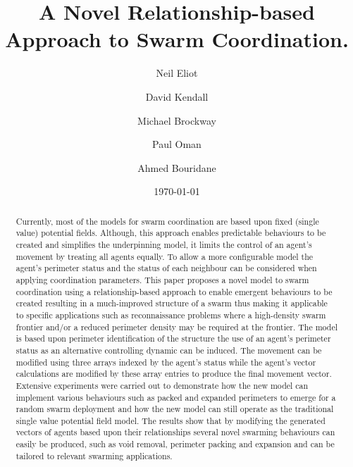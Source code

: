 \documentclass[12pt,a4paper]{IEEEtran}
\title{A Novel Relationship-based Approach to Swarm Coordination.}
\author[*]{Neil Eliot}
\author[ ]{David Kendall}
\author[ ]{Michael Brockway}
\author[ ]{Paul Oman}
\author[ ]{Ahmed Bouridane}
\affil[ ] {Department of Computer Sciences, Northumbria University}
\affil[*] {Corresponding author: Dr Neil Eliot, neil.eliot@northumbria.ac.uk}
\date{\today}
\begin{document}
\maketitle

\begin{abstract}
Currently, most of the models for swarm coordination are based upon fixed (single value) potential fields. Although, this approach enables predictable behaviours to be created and simplifies the underpinning model, it limits the control of an agent’s movement by treating all agents equally. To allow a more configurable model the agent’s perimeter status and the status of each neighbour can be considered when applying coordination parameters.  This paper proposes a novel model to swarm coordination using a relationship-based approach to enable emergent behaviours to be created resulting in a much-improved structure of a swarm thus making it applicable to specific applications such as reconnaissance problems where a high-density swarm frontier and/or a reduced perimeter density may be required at the frontier. The model is based upon perimeter identification of the structure the use of an agent’s perimeter status as an alternative controlling dynamic can be induced.
The movement can be modified using three arrays indexed by the agent’s status while the agent’s vector calculations are modified by these array entries to produce the final movement vector. Extensive experiments were carried out to demonstrate how the new model can implement various behaviours such as packed and expanded perimeters to emerge for a random swarm deployment and how the new model can still operate as the traditional single value potential field model. The results show that by modifying the generated vectors of agents based upon their relationships several novel swarming behaviours can easily be produced, such as void removal, perimeter packing and expansion and can be tailored to relevant swarming applications.
\end{abstract}
\end{document}
